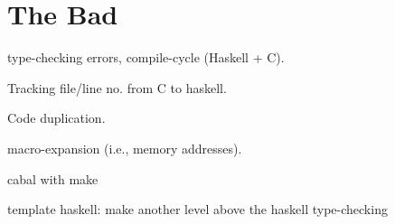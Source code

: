 \section{The Bad}


\begin{compactitem}
\item type-checking errors, compile-cycle (Haskell + C). 
\item Tracking file/line no. from C to haskell.
\item Code duplication.
\item macro-expansion (i.e., memory addresses).
\item cabal with make
\end{compactitem}

template haskell: make another level above the haskell type-checking

